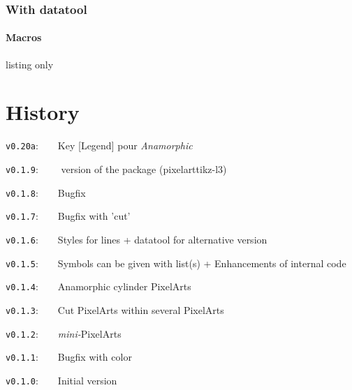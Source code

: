 \documentclass{article}
\begin{document}
\section{With datatool}

\subsection{Macros}

\begin{PresentationCode}{listing only}


\end{PresentationCode}

\begin{PresentationCode}{}


\end{PresentationCode}

\newpage

\part{History}

\verb|v0.20a|:~~~~Key \textsf{[Legend]} pour \textit{Anamorphic}

\verb|v0.1.9|:~~~~ version of the package (\textsf{pixelarttikz-l3})

\verb|v0.1.8|:~~~~Bugfix

\verb|v0.1.7|:~~~~Bugfix with 'cut'

\verb|v0.1.6|:~~~~Styles for lines + \textsf{datatool} for alternative version

\verb|v0.1.5|:~~~~Symbols can be given with list(s) + Enhancements of internal code

\verb|v0.1.4|:~~~~Anamorphic cylinder PixelArts

\verb|v0.1.3|:~~~~Cut PixelArts within several PixelArts

\verb|v0.1.2|:~~~~\textit{mini-}PixelArts

\verb|v0.1.1|:~~~~Bugfix with color

\verb|v0.1.0|:~~~~Initial version
\end{document}
